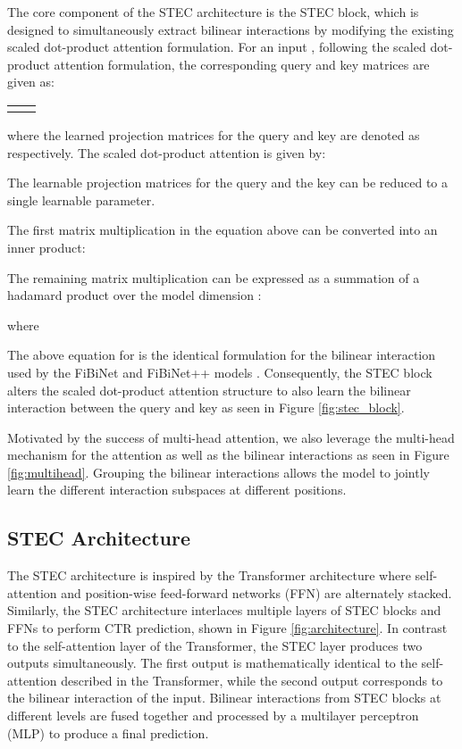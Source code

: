 \documentclass{article}
\begin{document}
The core component of the STEC architecture is the STEC block, which is designed to simultaneously extract bilinear interactions by modifying the existing scaled dot-product attention formulation.
For an input  , following the scaled dot-product attention formulation, the corresponding query and key matrices are given as: 

\noindent
\begin{tabularx}{\linewidth}{@{}XX@{}}

&

\end{tabularx}
where the learned projection matrices for the query and key are denoted as  respectively.
The scaled dot-product attention is given by:

The learnable projection matrices for the query and the key can be reduced to a single learnable parameter.

The first matrix multiplication in the equation above can be converted into an inner product:  

The remaining matrix multiplication can be expressed as a summation of a hadamard product over the model dimension  : 

where

The above equation for  is the identical formulation for the bilinear interaction used by the FiBiNet and FiBiNet++ models \cite{fibinet2019, fibinetpp2022}. Consequently, the STEC block alters the scaled dot-product attention structure to also learn the bilinear interaction between the query and key as seen in Figure \ref{fig:stec_block}.

Motivated by the success of multi-head attention, we also leverage the multi-head mechanism for the attention as well as the bilinear interactions as seen in Figure \ref{fig:multihead}. Grouping the bilinear interactions allows the model to jointly learn the different interaction subspaces at different positions.

\subsection{STEC Architecture}

The STEC architecture is inspired by the Transformer architecture where self-attention and position-wise feed-forward networks (FFN) are alternately stacked. Similarly, the STEC architecture interlaces multiple layers of STEC blocks and FFNs to perform CTR prediction, shown in Figure \ref{fig:architecture}. In contrast to the self-attention layer of the Transformer, the STEC layer produces two outputs simultaneously. The first output is mathematically identical to the self-attention described in the Transformer, while the second output corresponds to the bilinear interaction of the input. Bilinear interactions from STEC blocks at different levels are fused together and processed by a multilayer perceptron (MLP) to produce a final prediction.
\end{document}

